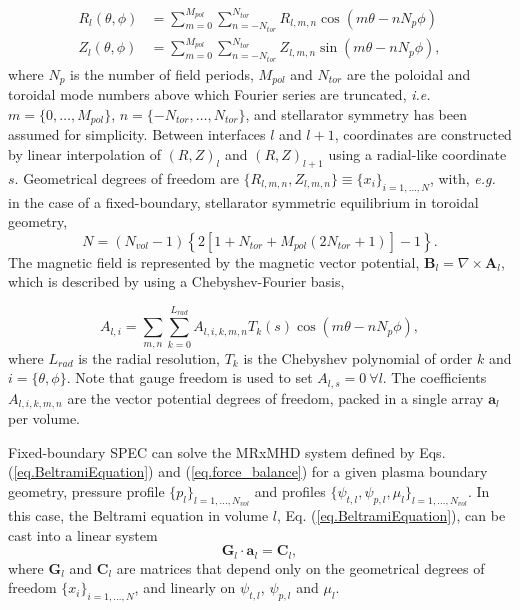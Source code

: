 \begin{align}
    R_l(\theta,\phi) &= \sum_{m=0}^{M_{pol}}\sum_{n=-N_{tor}}^{N_{tor}}R_{l,m,n} \cos(m\theta-nN_p\phi)\\
    Z_l(\theta,\phi) &= \sum_{m=0}^{M_{pol}}\sum_{n=-N_{tor}}^{N_{tor}}Z_{l,m,n} \sin(m\theta-nN_p\phi),
\end{align}
where $N_p$ is the number of field periods, $M_{pol}$ and $N_{tor}$ are the poloidal and toroidal mode numbers above which Fourier series are truncated, \textit{i.e.} $m=\{0,\ldots,M_{pol}\}$, $n=\{-N_{tor},\ldots,N_{tor}\}$, and stellarator symmetry has been assumed for simplicity. Between interfaces $l$ and $l+1$, coordinates are constructed by linear interpolation of $(R,Z)_l$ and $(R,Z)_{l+1}$ using a radial-like coordinate $s$. Geometrical degrees of freedom are $\{R_{l,m,n}, Z_{l,m,n}\}\equiv\{x_i\}_{i=1,\ldots,N}$, with, \textit{e.g.} in the case of a fixed-boundary, stellarator symmetric equilibrium in toroidal geometry,
\begin{equation}
    N = (N_{vol}-1)\left\{2\left[1+N_{tor} + M_{pol} \left( 2N_{tor} + 1 \right) \right] -1\right\}.
\end{equation}
The magnetic field is represented by the magnetic vector potential, $\mathbf{B}_l=\nabla\times\mathbf{A}_l$, which is described by using a Chebyshev-Fourier basis,

\begin{equation}
    A_{l,i} = \sum_{m,n}\sum_{k=0}^{L_{rad}} A_{l,i,k,m,n} T_k(s)\cos(m\theta-nN_p\phi),
\end{equation}
where $L_{rad}$ is the radial resolution, $T_k$ is the Chebyshev polynomial of order $k$ and $i=\{\theta,\phi\}$. Note that gauge freedom is used to set $A_{l,s}=0\ \forall l$. The coefficients $A_{l,i,k,m,n}$ are the vector potential degrees of freedom, packed in a single array $\mathbf{a}_l$ per volume.

Fixed-boundary \ac{SPEC} can solve the \ac{MRxMHD} system defined by Eqs.(\ref{eq.BeltramiEquation}) and (\ref{eq.force_balance}) for a given plasma boundary geometry, pressure profile $\{p_l\}_{l=1,\ldots,N_{vol}}$ and profiles $\{\psi_{t,l}, \psi_{p,l}, \mu_l\}_{l=1,\ldots,N_{vol}}$. In this case, the Beltrami equation in volume $l$, Eq. (\ref{eq.BeltramiEquation}), can be cast into a linear system
 \begin{equation}
     \mathbf{G}_l\cdot\mathbf{a}_l = \mathbf{C}_l, \label{eq.linearized_beltrami_system}
 \end{equation}
 where $\mathbf{G}_l$ and $\mathbf{C}_l$ are matrices that depend only on the geometrical degrees of freedom  $\{x_i\}_{i=1,\ldots,N}$, and linearly on $\psi_{t,l}$, $\psi_{p,l}$ and $\mu_l$. 
 

